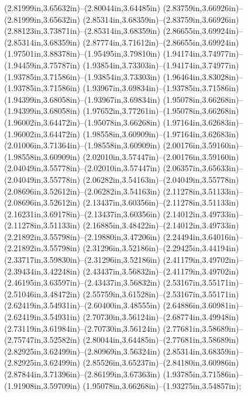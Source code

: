 (2.81999in,3.65632in)--(2.80044in,3.64485in) (2.83759in,3.66926in)--(2.81999in,3.65632in) (2.85314in,3.68359in)--(2.83759in,3.66926in) (2.88123in,3.73871in)--(2.85314in,3.68359in) (2.86655in,3.69924in)--(2.85314in,3.68359in) (2.87774in,3.71612in)--(2.86655in,3.69924in) (1.97501in,3.88378in)--(1.95495in,3.79810in) (1.94174in,3.74977in)--(1.94459in,3.75787in) (1.93854in,3.73303in)--(1.94174in,3.74977in) (1.93785in,3.71586in)--(1.93854in,3.73303in) (1.96464in,3.83028in)--(1.93785in,3.71586in) (1.93967in,3.69834in)--(1.93785in,3.71586in) (1.94399in,3.68058in)--(1.93967in,3.69834in) (1.95078in,3.66268in)--(1.94399in,3.68058in) (1.97652in,3.77261in)--(1.95078in,3.66268in) (1.96002in,3.64472in)--(1.95078in,3.66268in) (1.97164in,3.62683in)--(1.96002in,3.64472in) (1.98558in,3.60909in)--(1.97164in,3.62683in) (2.01006in,3.71364in)--(1.98558in,3.60909in) (2.00176in,3.59160in)--(1.98558in,3.60909in) (2.02010in,3.57447in)--(2.00176in,3.59160in) (2.04049in,3.55778in)--(2.02010in,3.57447in) (2.06357in,3.65633in)--(2.04049in,3.55778in) (2.06282in,3.54163in)--(2.04049in,3.55778in) (2.08696in,3.52612in)--(2.06282in,3.54163in) (2.11278in,3.51133in)--(2.08696in,3.52612in) (2.13437in,3.60356in)--(2.11278in,3.51133in) (2.16231in,3.69178in)--(2.13437in,3.60356in) (2.14012in,3.49733in)--(2.11278in,3.51133in) (2.16885in,3.48422in)--(2.14012in,3.49733in) (2.21892in,3.55798in)--(2.19880in,3.47206in) (2.24494in,3.64016in)--(2.21892in,3.55798in) (2.31296in,3.52186in)--(2.29425in,3.44194in) (2.33717in,3.59830in)--(2.31296in,3.52186in) (2.41179in,3.49702in)--(2.39434in,3.42248in) (2.43437in,3.56832in)--(2.41179in,3.49702in) (2.46195in,3.63597in)--(2.43437in,3.56832in) (2.53167in,3.55171in)--(2.51046in,3.48472in) (2.55759in,3.61528in)--(2.53167in,3.55171in) (2.62419in,3.54931in)--(2.60400in,3.48555in) (2.64886in,3.60981in)--(2.62419in,3.54931in) (2.70730in,3.56124in)--(2.68774in,3.49948in) (2.73119in,3.61984in)--(2.70730in,3.56124in) (2.77681in,3.58689in)--(2.75747in,3.52582in) (2.80044in,3.64485in)--(2.77681in,3.58689in) (2.82925in,3.62499in)--(2.80969in,3.56324in) (2.85314in,3.68359in)--(2.82925in,3.62499in) (2.85526in,3.65237in)--(2.84180in,3.60986in) (2.87844in,3.71396in)--(2.86199in,3.67363in) (1.93785in,3.71586in)--(1.91908in,3.59709in) (1.95078in,3.66268in)--(1.93275in,3.54857in);
